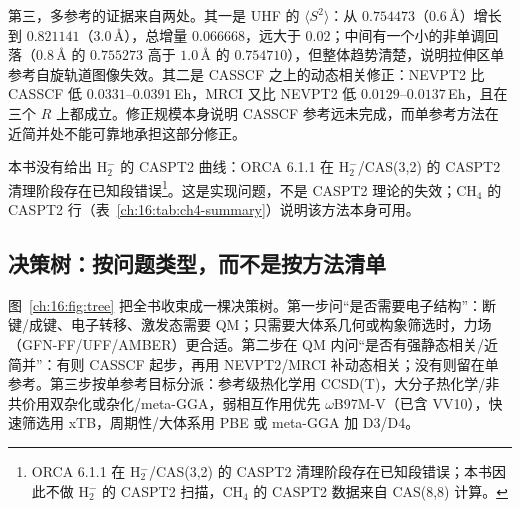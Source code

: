 第三，多参考的证据来自两处。其一是 UHF 的 $\langle S^2\rangle$：从 $0.754473$（$0.6$\,\AA）增长到 $0.821141$（$3.0$\,\AA），总增量 $0.066668$，远大于 $0.02$；中间有一个小的非单调回落（$0.8$\,\AA{} 的 $0.755273$ 高于 $1.0$\,\AA{} 的 $0.754710$），但整体趋势清楚，说明拉伸区单参考自旋轨道图像失效。其二是 CASSCF 之上的动态相关修正：NEVPT2 比 CASSCF 低 $0.0331$–$0.0391$\,Eh，MRCI 又比 NEVPT2 低 $0.0129$–$0.0137$\,Eh，且在三个 $R$ 上都成立。修正规模本身说明 CASSCF 参考远未完成，而单参考方法在近简并处不能可靠地承担这部分修正。

本书没有给出 H$_2^-$ 的 CASPT2 曲线：ORCA 6.1.1 在 H$_2^-$/CAS(3,2) 的 CASPT2 清理阶段存在已知段错误\footnote{ORCA 6.1.1 在 H$_2^-$/CAS(3,2) 的 CASPT2 清理阶段存在已知段错误；本书因此不做 H$_2^-$ 的 CASPT2 扫描，CH$_4$ 的 CASPT2 数据来自 CAS(8,8) 计算。}。这是实现问题，不是 CASPT2 理论的失效；CH$_4$ 的 CASPT2 行（表~\ref{ch:16:tab:ch4-summary}）说明该方法本身可用。

\subsection{决策树：按问题类型，而不是按方法清单}
\label{ch:16:sec:tree}

图~\ref{ch:16:fig:tree} 把全书收束成一棵决策树。第一步问“是否需要电子结构”：断键/成键、电子转移、激发态需要 QM；只需要大体系几何或构象筛选时，力场（GFN-FF/UFF/AMBER）更合适。第二步在 QM 内问“是否有强静态相关/近简并”：有则 CASSCF 起步，再用 NEVPT2/MRCI 补动态相关；没有则留在单参考。第三步按单参考目标分派：参考级热化学用 CCSD(T)，大分子热化学/非共价用双杂化或杂化/meta-GGA，弱相互作用优先 $\omega$B97M-V（已含 VV10），快速筛选用 xTB，周期性/大体系用 PBE 或 meta-GGA 加 D3/D4。

